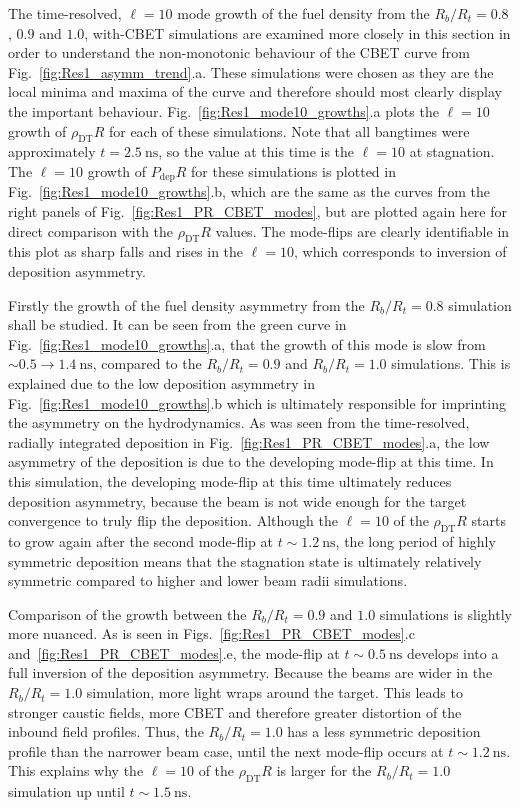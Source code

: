 The time-resolved, $\ell=10$ mode growth of the fuel density from the $R_b/R_t=0.8$, $0.9$ and $1.0$, with-\ac{CBET} simulations are examined more closely in this section in order to understand the non-monotonic behaviour of the \ac{CBET} curve from Fig.~\ref{fig:Res1_asymm_trend}.a.
These simulations were chosen as they are the local minima and maxima of the curve and therefore should most clearly display the important behaviour.
Fig.~\ref{fig:Res1_mode10_growths}.a plots the $\ell=10$ growth of $\rho_{\text{DT}}R$ for each of these simulations.
Note that all bangtimes were approximately $t=2.5\ \text{ns}$, so the value at this time is the $\ell=10$ at stagnation.
The $\ell=10$ growth of $P_{\text{dep}}R$ for these simulations is plotted in Fig.~\ref{fig:Res1_mode10_growths}.b, which are the same as the curves from the right panels of Fig.~\ref{fig:Res1_PR_CBET_modes}, but are plotted again here for direct comparison with the $\rho_{\text{DT}}R$ values.
The mode-flips are clearly identifiable in this plot as sharp falls and rises in the $\ell=10$, which corresponds to inversion of deposition asymmetry.

Firstly the growth of the fuel density asymmetry from the $R_b/R_t=0.8$ simulation shall be studied.
It can be seen from the green curve in Fig.~\ref{fig:Res1_mode10_growths}.a, that the growth of this mode is slow from $\sim0.5\rightarrow1.4\ \text{ns}$, compared to the $R_b/R_t=0.9$ and $R_b/R_t=1.0$ simulations.
This is explained due to the low deposition asymmetry in Fig.~\ref{fig:Res1_mode10_growths}.b which is ultimately responsible for imprinting the asymmetry on the hydrodynamics.
As was seen from the time-resolved, radially integrated deposition in Fig.~\ref{fig:Res1_PR_CBET_modes}.a, the low asymmetry of the deposition is due to the developing mode-flip at this time.
In this simulation, the developing mode-flip at this time ultimately reduces deposition asymmetry, because the beam is not wide enough for the target convergence to truly flip the deposition.
Although the $\ell=10$ of the $\rho_{\text{DT}}R$ starts to grow again after the second mode-flip at $t\sim1.2\ \text{ns}$, the long period of highly symmetric deposition means that the stagnation state is ultimately relatively symmetric compared to higher and lower beam radii simulations.

Comparison of the growth between the $R_b/R_t=0.9$ and $1.0$ simulations is slightly more nuanced.
As is seen in Figs.~\ref{fig:Res1_PR_CBET_modes}.c and~\ref{fig:Res1_PR_CBET_modes}.e, the mode-flip at $t\sim0.5\ \text{ns}$ develops into a full inversion of the deposition asymmetry.
Because the beams are wider in the $R_b/R_t=1.0$ simulation, more light wraps around the target.
This leads to stronger caustic fields, more \ac{CBET} and therefore greater distortion of the inbound field profiles.
Thus, the $R_b/R_t=1.0$ has a less symmetric deposition profile than the narrower beam case, until the next mode-flip occurs at $t\sim1.2\ \text{ns}$.
This explains why the $\ell=10$ of the $\rho_{\text{DT}}R$ is larger for the $R_b/R_t=1.0$ simulation up until $t\sim1.5\ \text{ns}$.

